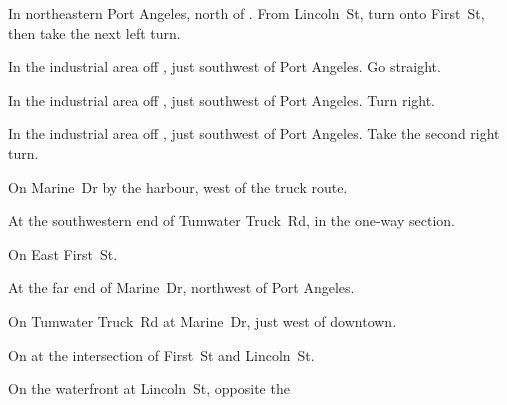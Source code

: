 
\begin{LocationList}

In northeastern Port Angeles, north of .
From  Lincoln~St, turn onto  First~St, then take the next left turn.

In the industrial area off , just southwest of Port Angeles.
Go straight.

In the industrial area off , just southwest of Port Angeles.
Turn right.

In the industrial area off , just southwest of Port Angeles.
Take the second right turn.

\Location{\GasStation \Gas \Rest}
On Marine~Dr by the harbour, west of the truck route.

At the southwestern end of Tumwater Truck~Rd, in the one-way section.

On  East First~St.

At the far end of Marine~Dr, northwest of Port Angeles.

On Tumwater Truck~Rd at Marine~Dr, just west of downtown.

On  at the intersection of First~St and Lincoln~St.

\Location{\TruckService \Service \Rest}
On the waterfront at Lincoln~St, opposite the 

\end{LocationList}
